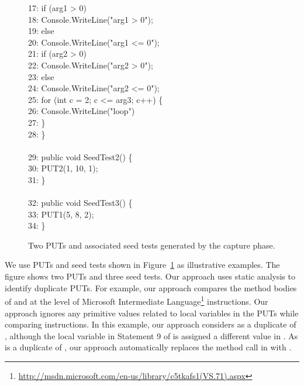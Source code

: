 \begin{figure}[t]
\begin{CodeOut}
17: \hspace*{0.2in}if (arg1 > 0)\\
18: \hspace*{0.4in}Console.WriteLine("arg1 > 0"); \\
19: \hspace*{0.2in}else\\
20: \hspace*{0.4in}Console.WriteLine("arg1 <= 0"); \\
21: \hspace*{0.2in}if (arg2 > 0)\\
22: \hspace*{0.4in}Console.WriteLine("arg2 > 0");  \\
23: \hspace*{0.2in}else\\
24: \hspace*{0.4in}Console.WriteLine("arg2 <= 0"); \\
25: \hspace*{0.2in}for (int c = 2; c <= arg3; c++)  \{ \\
26: \hspace*{0.4in}Console.WriteLine("loop") \\
27: \hspace*{0.2in}\}\\
28: \}\\
\\
29: public void SeedTest2() \{\\
30: \hspace*{0.2in}PUT2(1, 10, 1);\\
31: \}\\
\\
32: public void SeedTest3() \{\\
33: \hspace*{0.2in}PUT1(5, 8, 2);\\
34: \}\\
\end{CodeOut}\vspace*{-2ex}
\caption{\label{fig:samplePutAndUT}Two PUTs and associated seed tests generated by the capture phase.}\vspace*{-2ex}
\end{figure}

We use PUTs and seed tests shown in Figure~\ref{fig:samplePutAndUT} as 
illustrative examples. The figure shows two PUTs
and three seed tests. Our approach uses static analysis to identify duplicate
PUTs. For example, our approach compares the method bodies of  and
 at the level of Microsoft Intermediate 
Language\footnote{\url{http://msdn.microsoft.com/en-us/library/c5tkafs1(VS.71).aspx}}
instructions. Our approach ignores any primitive values related to local
variables in the PUTs while comparing instructions. 
In this example, our approach considers  as a duplicate of ,
although the local variable  in Statement 9 of  is assigned a different value
in . As  is a duplicate of , our approach automatically replaces
the  method call in  with .

